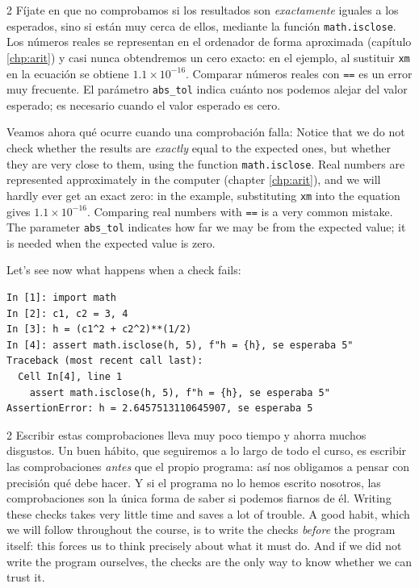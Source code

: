 \begin{paracol}{2}
Fíjate en que no comprobamos si los resultados son \emph{exactamente} iguales a los esperados, sino si están muy cerca de ellos, mediante la función \texttt{math.isclose}. Los números reales se representan en el ordenador de forma aproximada (capítulo \ref{chp:arit}) y casi nunca obtendremos un cero exacto: en el ejemplo, al sustituir \texttt{xm} en la ecuación se obtiene $1.1\times 10^{-16}$. Comparar números reales con \texttt{==} es un error muy frecuente. El parámetro \texttt{abs_tol} indica cuánto nos podemos alejar del valor esperado; es necesario cuando el valor esperado es cero.

Veamos ahora qué ocurre cuando una comprobación falla:
\switchcolumn
Notice that we do not check whether the results are \emph{exactly} equal to the expected ones, but whether they are very close to them, using the function \texttt{math.isclose}. Real numbers are represented approximately in the computer (chapter \ref{chp:arit}), and we will hardly ever get an exact zero: in the example, substituting \texttt{xm} into the equation gives $1.1\times 10^{-16}$. Comparing real numbers with \texttt{==} is a very common mistake. The parameter \texttt{abs_tol} indicates how far we may be from the expected value; it is needed when the expected value is zero.

Let's see now what happens when a check fails:
\end{paracol}

\begin{verbatim}
In [1]: import math
In [2]: c1, c2 = 3, 4
In [3]: h = (c1^2 + c2^2)**(1/2)
In [4]: assert math.isclose(h, 5), f"h = {h}, se esperaba 5"
Traceback (most recent call last):
  Cell In[4], line 1
    assert math.isclose(h, 5), f"h = {h}, se esperaba 5"
AssertionError: h = 2.6457513110645907, se esperaba 5
\end{verbatim}

\begin{paracol}{2}
Escribir estas comprobaciones lleva muy poco tiempo y ahorra muchos disgustos. Un buen hábito, que seguiremos a lo largo de todo el curso, es escribir las comprobaciones \emph{antes} que el propio programa: así nos obligamos a pensar con precisión qué debe hacer. Y si el programa no lo hemos escrito nosotros, las comprobaciones son la única forma de saber si podemos fiarnos de él.
\switchcolumn
Writing these checks takes very little time and saves a lot of trouble. A good habit, which we will follow throughout the course, is to write the checks \emph{before} the program itself: this forces us to think precisely about what it must do. And if we did not write the program ourselves, the checks are the only way to know whether we can trust it.
\end{paracol}

